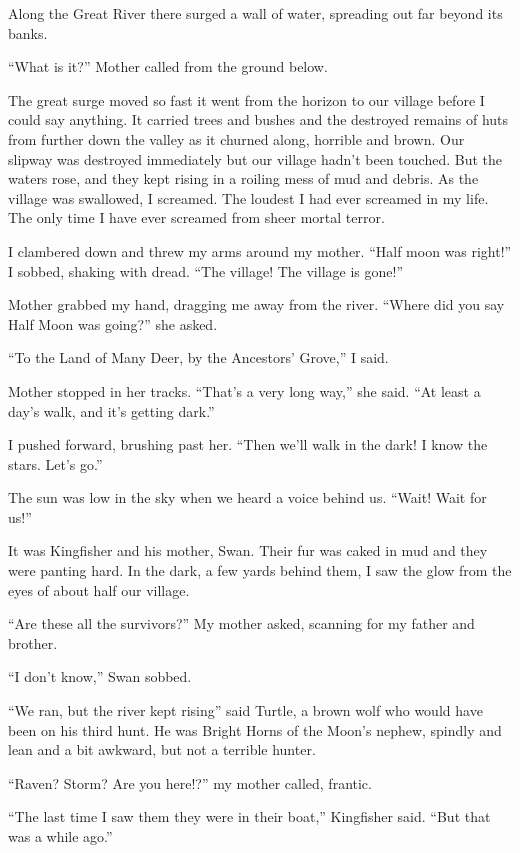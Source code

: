 Along the Great River there surged a wall of water, spreading out far beyond its banks.

``What is it?'' Mother called from the ground below.

The great surge moved so fast it went from the horizon to our village before I could say anything. It carried trees and bushes and the destroyed remains of huts from further down the valley as it churned along, horrible and brown. Our slipway was destroyed immediately but our village hadn't been touched. But the waters rose, and they kept rising in a roiling mess of mud and debris. As the village was swallowed, I screamed. The loudest I had ever screamed in my life. The only time I have ever screamed from sheer mortal terror.

I clambered down and threw my arms around my mother. ``Half moon was right!'' I sobbed, shaking with dread. ``The village! The village is gone!''

Mother grabbed my hand, dragging me away from the river. ``Where did you say Half Moon was going?'' she asked.

``To the Land of Many Deer, by the Ancestors' Grove,'' I said.

Mother stopped in her tracks. ``That's a very long way,'' she said. ``At least a day's walk, and it's getting dark.''

I pushed forward, brushing past her. ``Then we'll walk in the dark! I know the stars. Let's go.''

\secdiv

The sun was low in the sky when we heard a voice behind us. ``Wait! Wait for us!''

It was Kingfisher and his mother, Swan. Their fur was caked in mud and they were panting hard. In the dark, a few yards behind them, I saw the glow from the eyes of about half our village.

``Are these all the survivors?'' My mother asked, scanning for my father and brother.

``I don't know,'' Swan sobbed.

``We ran, but the river kept rising'' said Turtle, a brown wolf who would have been on his third hunt. He was Bright Horns of the Moon's nephew, spindly and lean and a bit awkward, but not a terrible hunter.

``Raven? Storm? Are you here!?'' my mother called, frantic.

``The last time I saw them they were in their boat,'' Kingfisher said. ``But that was a while ago.''

